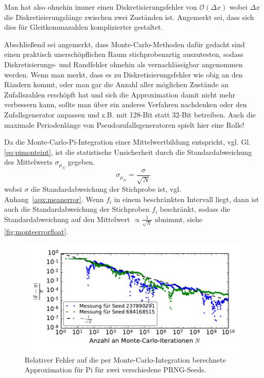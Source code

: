 Man hat also ohnehin immer einen Diskretisierungsfehler von $\mathcal{O}\left(\Delta x\right)$ wobei $\Delta x$ die Diskretisierungslänge zwischen zwei Zuständen ist. Angemerkt sei, dass sich dies für Gleitkommazahlen komplizierter gestaltet.

Abschließend sei angemerkt, dass Monte-Carlo-Methoden dafür gedacht sind einen praktisch unerschöpflichen Raum stichprobenartig auszutesten, sodass Diskretisierungs- und Randfehler ohnehin als vernachlässigbar angenommen werden.
Wenn man merkt, dass es zu Diskretisierungsfehler wie obig an den Rändern kommt, oder man gar die Anzahl aller möglichen Zustände an Zufallszahlen erschöpft hat und sich die Approximation damit nicht mehr verbessern kann, sollte man über ein anderes Verfahren nachdenken oder den Zufallsgenerator anpassen und z.B. mit 128-Bit statt 32-Bit betreiben.
Auch die maximale Periodenlänge von Pseudozufallsgeneratoren spielt hier eine Rolle!

Da die Monte-Carlo-Pi-Integration einer Mittelwertbildung entspricht, vgl. Gl.\ref{eq:pimonteint}, ist die statistische Unsicherheit durch die Standardabweichung des Mittelwerts $\sigma_{\mu_N}$ gegeben.
\begin{equation}
    \sigma_{\mu_N} = \frac{\sigma}{\sqrt{N}}
\end{equation}
wobei $\sigma$ die Standardabweichung der Stichprobe ist, vgl. Anhang~\ref{apx:meanerror}.
Wenn $f_i$ in einem beschränkten Intervall liegt, dann ist auch die Standardabweichung der Stichproben $f_i$ beschränkt, sodass die Standardabweichung auf den Mittelwert $\propto \frac{1}{\sqrt{N}}$ abnimmt, siehe \autoref{fig:monteerrorfloat}.

\begin{figure}
    \centering
    \begin{minipage}{0.7\linewidth}
        \includegraphics[width=\linewidth]{monte-carlo-pi-error-scaling}
    \end{minipage}
    \caption{Relativer Fehler auf die per Monte-Carlo-Integration berechnete Approximation für Pi für zwei verschiedene PRNG-Seeds.}
    \label{fig:monteerrorfloat}
\end{figure}


